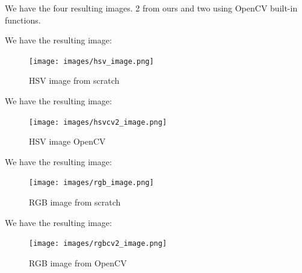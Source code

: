 \documentclass[12pt]{article}
\begin{document}
\noindent
We have the four resulting images. 2 from ours and two using OpenCV built-in functions.

\noindent
We have the resulting image:
\begin{figure}[H]
\centering
    \texttt{[image: images/hsv\_image.png]}
    \caption{HSV image from scratch}
\end{figure}

\noindent
We have the resulting image:
\begin{figure}[H]
\centering
    \texttt{[image: images/hsvcv2\_image.png]}
    \caption{HSV image OpenCV}
\end{figure}

\noindent
We have the resulting image:
\begin{figure}[H]
\centering
    \texttt{[image: images/rgb\_image.png]}
    \caption{RGB image from scratch}
\end{figure}

\noindent
We have the resulting image:
\begin{figure}[H]
\centering
    \texttt{[image: images/rgbcv2\_image.png]}
    \caption{RGB image from OpenCV}
\end{figure}
\end{document}
